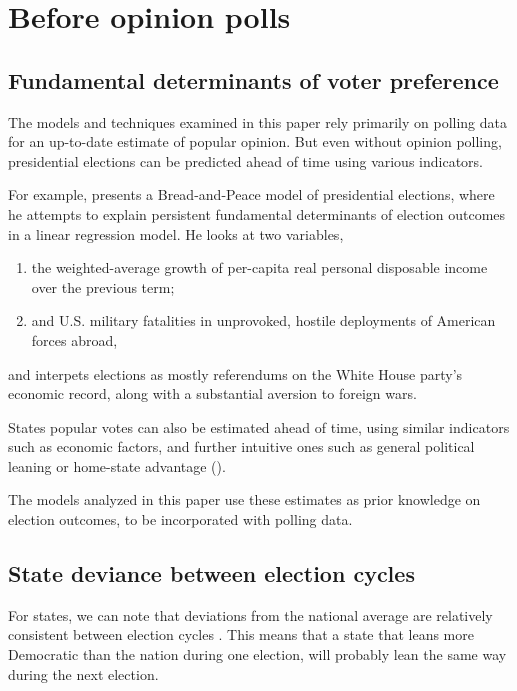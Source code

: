 \documentclass[thesis.tex]{subfiles}
\begin{document}
\section{Before opinion polls}

\subsection{Fundamental determinants of voter preference}

The models and techniques examined in this paper rely primarily on polling data for an up-to-date estimate of popular opinion. But even without opinion polling, presidential elections can be predicted ahead of time using various indicators.

For example, \cite{Hibbs:2008aa} presents a Bread-and-Peace model of presidential elections, where he attempts to explain persistent fundamental determinants of election outcomes in a linear regression model. He looks at two variables, \begin{enumerate}
	\item the weighted-average growth of per-capita real personal disposable income over the previous term;
	\item and U.S. military fatalities in unprovoked, hostile deployments of American forces abroad,
\end{enumerate} and interpets elections as mostly referendums on the White House party's economic record, along with a substantial aversion to foreign wars. 

States popular votes can also be estimated ahead of time, using similar indicators such as economic factors, and further intuitive ones such as general political leaning or home-state advantage (\citealt{Campbell:1992aa,Campbell:2006aa}).

The models analyzed in this paper use these estimates as prior knowledge on election outcomes, to be incorporated with polling data.

\subsection{State deviance between election cycles}

For states, we can note that deviations from the national average are relatively consistent between election cycles \cite{Lock:2010aa}. This means that a state that leans more Democratic than the nation during one election, will probably lean the same way during the next election.
\end{document}
